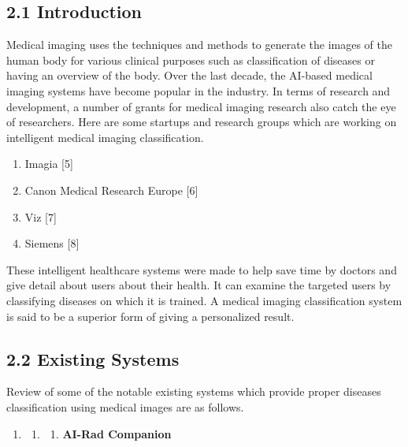 \documentclass{article} %
\begin{document}
\noindent 
\subsection{2.1 Introduction}

\noindent Medical imaging uses the techniques and methods to generate the images of the human body for various clinical purposes such as classification of diseases or having an overview of the body. Over the last decade, the AI-based medical imaging systems have become popular in the industry. In terms of research and development, a number of grants for medical imaging research also catch the eye of researchers. Here are some startups and research groups which are working on intelligent medical imaging classification.~

\begin{enumerate}
\item  Imagia [5]\underbar{ }

\item  Canon Medical Research Europe [6]

\item  Viz [7]

\item  Siemens [8]
\end{enumerate}

\noindent These intelligent healthcare systems were made to help save time by doctors and give detail about users about their health. It can examine the targeted users by classifying diseases on which it is trained. A medical imaging classification system is said to be a superior form of giving a personalized result.

\noindent 
\subsection{2.2 Existing Systems}

\noindent Review of some of the notable existing systems which provide proper diseases classification using medical images are as follows.

\begin{enumerate}
\item \begin{enumerate}
\item \begin{enumerate}
\item  \textbf{AI-Rad Companion}
\end{enumerate}
\end{enumerate}
\end{enumerate}
\end{document}
